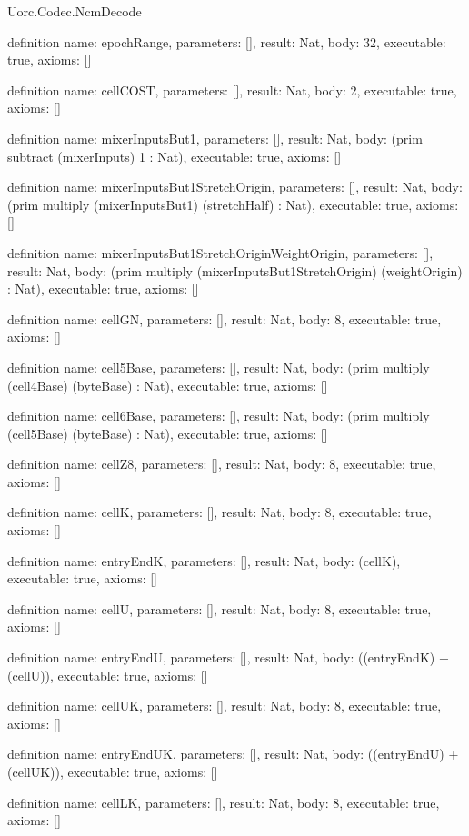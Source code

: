 \begin{lexlean}{Uorc.Codec.NcmDecode}
\begin{semanticmodule}
definition{
  name: epochRange,
  parameters: [],
  result: Nat,
  body: 32,
  executable: true,
  axioms: []
}

definition{
  name: cellCOST,
  parameters: [],
  result: Nat,
  body: 2,
  executable: true,
  axioms: []
}

definition{
  name: mixerInputsBut1,
  parameters: [],
  result: Nat,
  body: (prim subtract (mixerInputs) 1 : Nat),
  executable: true,
  axioms: []
}

definition{
  name: mixerInputsBut1StretchOrigin,
  parameters: [],
  result: Nat,
  body: (prim multiply (mixerInputsBut1) (stretchHalf) : Nat),
  executable: true,
  axioms: []
}

definition{
  name: mixerInputsBut1StretchOriginWeightOrigin,
  parameters: [],
  result: Nat,
  body: (prim multiply (mixerInputsBut1StretchOrigin) (weightOrigin) : Nat),
  executable: true,
  axioms: []
}

definition{
  name: cellGN,
  parameters: [],
  result: Nat,
  body: 8,
  executable: true,
  axioms: []
}

definition{
  name: cell5Base,
  parameters: [],
  result: Nat,
  body: (prim multiply (cell4Base) (byteBase) : Nat),
  executable: true,
  axioms: []
}

definition{
  name: cell6Base,
  parameters: [],
  result: Nat,
  body: (prim multiply (cell5Base) (byteBase) : Nat),
  executable: true,
  axioms: []
}

definition{
  name: cellZ8,
  parameters: [],
  result: Nat,
  body: 8,
  executable: true,
  axioms: []
}

definition{
  name: cellK,
  parameters: [],
  result: Nat,
  body: 8,
  executable: true,
  axioms: []
}

definition{
  name: entryEndK,
  parameters: [],
  result: Nat,
  body: (cellK),
  executable: true,
  axioms: []
}

definition{
  name: cellU,
  parameters: [],
  result: Nat,
  body: 8,
  executable: true,
  axioms: []
}

definition{
  name: entryEndU,
  parameters: [],
  result: Nat,
  body: ((entryEndK) + (cellU)),
  executable: true,
  axioms: []
}

definition{
  name: cellUK,
  parameters: [],
  result: Nat,
  body: 8,
  executable: true,
  axioms: []
}

definition{
  name: entryEndUK,
  parameters: [],
  result: Nat,
  body: ((entryEndU) + (cellUK)),
  executable: true,
  axioms: []
}

definition{
  name: cellLK,
  parameters: [],
  result: Nat,
  body: 8,
  executable: true,
  axioms: []
}


\end{semanticmodule}
\end{lexlean}
